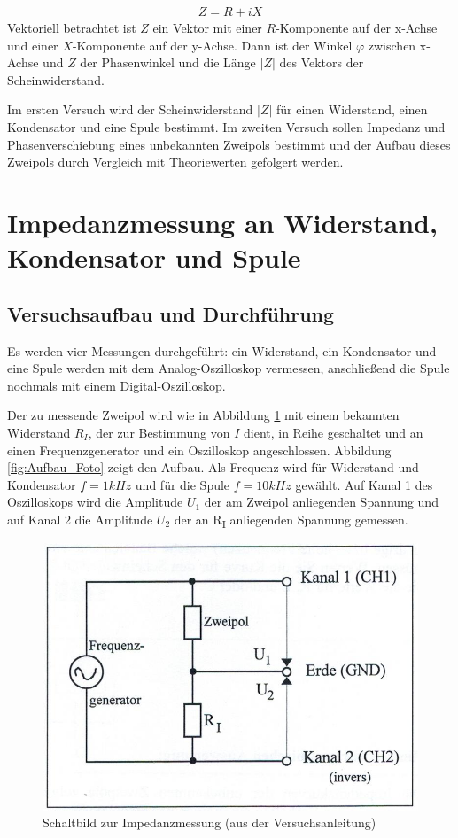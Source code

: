 \documentclass{scrartcl}
\begin{document}
\begin{align}
Z = R + iX
\end{align}
Vektoriell betrachtet ist $Z$ ein Vektor mit einer $R$-Komponente auf der x-Achse und einer $X$-Komponente auf der y-Achse. Dann ist der Winkel $\varphi$ zwischen x-Achse und $Z$ der Phasenwinkel und die Länge $|Z|$ des Vektors der Scheinwiderstand.

Im ersten Versuch wird der Scheinwiderstand $|Z|$ für einen Widerstand, einen Kondensator und eine Spule bestimmt. Im zweiten Versuch sollen Impedanz und Phasenverschiebung eines unbekannten Zweipols bestimmt und der Aufbau dieses Zweipols durch Vergleich mit Theoriewerten gefolgert werden.
\section{Impedanzmessung an Widerstand, Kondensator und Spule}
\subsection{Versuchsaufbau und Durchführung}
Es werden vier Messungen durchgeführt: ein Widerstand, ein Kondensator und eine Spule werden mit dem Analog-Oszilloskop vermessen, anschließend die Spule nochmals mit einem Digital-Oszilloskop.

Der zu messende Zweipol wird wie in Abbildung \ref{fig:Aufbau} mit einem bekannten Widerstand $R_{I}$, der zur Bestimmung von $I$ dient, in Reihe geschaltet und an einen Frequenzgenerator und ein Oszilloskop angeschlossen. Abbildung \ref{fig:Aufbau_Foto} zeigt den Aufbau. Als Frequenz wird für Widerstand und Kondensator $f = 1kHz$ und für die Spule $f = 10kHz$ gewählt. Auf Kanal 1 des Oszilloskops wird die Amplitude $U_{1}$ der am Zweipol anliegenden Spannung und auf Kanal 2 die Amplitude $U_{2}$ der an R\textsubscript{I} anliegenden Spannung gemessen. 

\begin{figure}[H]
  \centering
    \includegraphics[scale=0.75]{Aufbau.PNG}
  \caption{Schaltbild zur Impedanzmessung (aus der Versuchsanleitung)}
  \label{fig:Aufbau}
\end{figure}
\end{document}
